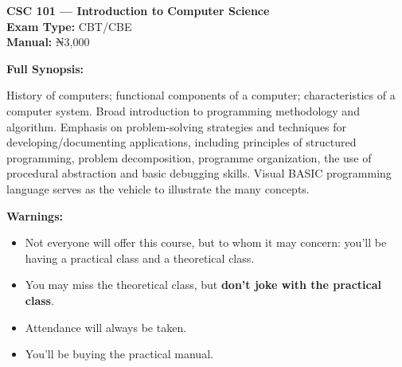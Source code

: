 \documentclass[11pt,a4paper]{article}
\begin{document}
\newpage
\begin{coursebox}
    \textbf{\color{primary}\Large CSC 101 --- Introduction to Computer Science}\\[0.3em]
    \textbf{Exam Type:} CBT/CBE \\
    \textbf{Manual:} ₦3,000

    \vspace{0.8em}

    \textbf{Full Synopsis:}

    History of computers; functional components of a computer; characteristics of a computer system. Broad introduction to programming methodology and algorithm. Emphasis on problem-solving strategies and techniques for developing/documenting applications, including principles of structured programming, problem decomposition, programme organization, the use of procedural abstraction and basic debugging skills. Visual BASIC programming language serves as the vehicle to illustrate the many concepts.

    \vspace{0.8em}

    \textbf{\color{warningText}Warnings:}
    \begin{itemize}[leftmargin=1.5em, itemsep=0.2em]
        \item Not everyone will offer this course, but to whom it may concern: you'll be having a practical class and a theoretical class.
        \item You may miss the theoretical class, but \textbf{don't joke with the practical class}.
        \item Attendance will always be taken.
        \item You'll be buying the practical manual.
    \end{itemize}
\end{coursebox}
\end{document}
